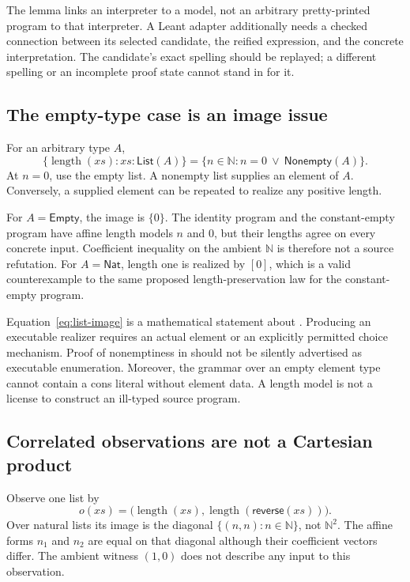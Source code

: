 \documentclass[11pt,letterpaper]{article}
\newcommand{\code}[1]{\texttt{\detokenize{#1}}}
\newcommand{\N}{\mathbb N}\newcommand{\Z}{\mathbb Z}\newcommand{\Q}{\mathbb Q}\newcommand{\R}{\mathbb R}
\theoremstyle{definition}\newtheorem{definition}[theorem]{Definition}
\theoremstyle{remark}\newtheorem{remark}[theorem]{Remark}
\begin{document}
The lemma links an interpreter to a model, not an arbitrary pretty-printed
program to that interpreter. A Leant adapter additionally needs a checked
connection between its selected candidate, the reified expression, and the
concrete interpretation. The candidate's exact spelling should be replayed;
a different spelling or an incomplete proof state cannot stand in for it.

\subsection{The empty-type case is an image issue}
For an arbitrary type $A$,
\begin{equation}\label{eq:list-image}
 \{\operatorname{length}(xs):xs:\mathsf{List}(A)\}
  =\{n\in\N:n=0\ \lor\ \mathsf{Nonempty}(A)\}.
\end{equation}
At $n=0$, use the empty list. A nonempty list supplies an element of $A$.
Conversely, a supplied element can be repeated to realize any positive length.

For $A=\mathsf{Empty}$, the image is $\{0\}$. The identity program and the
constant-empty program have affine length models $n$ and $0$, but their
lengths agree on every concrete input. Coefficient inequality on the ambient
$\N$ is therefore not a source refutation. For $A=\mathsf{Nat}$, length one
is realized by $[0]$, which is a valid counterexample to the same proposed
length-preservation law for the constant-empty program.

Equation~\eqref{eq:list-image} is a mathematical statement about
\code{Nonempty A}. Producing an executable realizer requires an actual
element or an explicitly permitted choice mechanism. Proof of nonemptiness
in \code{Prop} should not be silently advertised as executable enumeration.
Moreover, the grammar over an empty element type cannot contain a cons literal
without element data. A length model is not a license to construct an
ill-typed source program.

\subsection{Correlated observations are not a Cartesian product}
Observe one list by
\[
 o(xs)=\bigl(\operatorname{length}(xs),
             \operatorname{length}(\mathsf{reverse}(xs))\bigr).
\]
Over natural lists its image is the diagonal
$\{(n,n):n\in\N\}$, not $\N^2$. The affine forms $n_1$ and $n_2$
are equal on that diagonal although their coefficient vectors differ.
The ambient witness $(1,0)$ does not describe any input to this observation.
\end{document}
